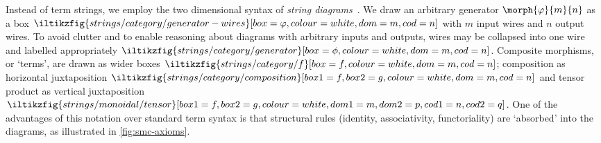 \documentclass{lmcs}
\begin{document}
Instead of term strings, we employ the two dimensional syntax of
\emph{string diagrams}~\cite{joyal1991geometry,joyal1996traced,selinger2011survey}.
We draw an arbitrary generator \(\morph{\varphi}{m}{n}\) as a box \(
\iltikzfig{strings/category/generator-wires}[box=\varphi,colour=white,dom=m,cod=n]
\) with \(m\) input wires and \(n\) output wires.
To avoid clutter and to enable reasoning about diagrams with arbitrary
inputs and outputs, wires may be collapsed into one wire and labelled
appropriately \(
\iltikzfig{strings/category/generator}[box=\phi,colour=white,dom=m,cod=n]
\).
Composite morphisms, or `terms', are drawn as wider boxes \(
\iltikzfig{strings/category/f}[box=f,colour=white,dom=m,cod=n]
\); composition as horizontal juxtaposition \(
\iltikzfig{strings/category/composition}[box1=f,box2=g,colour=white,dom=m,cod=n]
\) and tensor product as vertical juxtaposition \(
\iltikzfig{strings/monoidal/tensor}[box1=f,box2=g,colour=white,dom1=m,dom2=p,cod1=n,cod2=q]
\).
One of the advantages of this notation over standard term syntax is that
structural rules (identity, associativity, functoriality) are `absorbed' into
the diagrams, as illustrated in \cref{fig:smc-axioms}.
\end{document}
